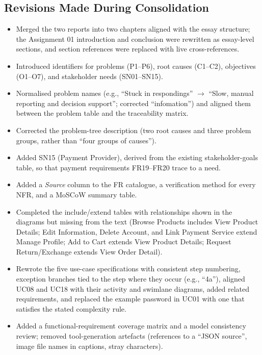 \documentclass[11pt,a4paper,oneside]{extreport}
\begin{document}
\subsection*{Revisions Made During Consolidation}
\begin{itemize}
  \item Merged the two reports into two chapters aligned with the essay structure; the Assignment 01 introduction and conclusion were rewritten as essay-level sections, and section references were replaced with live cross-references.
  \item Introduced identifiers for problems (P1--P6), root causes (C1--C2), objectives (O1--O7), and stakeholder needs (SN01--SN15).
  \item Normalised problem names (e.g., ``Stuck in respondings'' $\rightarrow$ ``Slow, manual reporting and decision support''; corrected ``infomation'') and aligned them between the problem table and the traceability matrix.
  \item Corrected the problem-tree description (two root causes and three problem groups, rather than ``four groups of causes'').
  \item Added SN15 (Payment Provider), derived from the existing stakeholder-goals table, so that payment requirements FR19--FR20 trace to a need.
  \item Added a \emph{Source} column to the FR catalogue, a verification method for every NFR, and a MoSCoW summary table.
  \item Completed the include/extend tables with relationships shown in the diagrams but missing from the text (Browse Products includes View Product Details; Edit Information, Delete Account, and Link Payment Service extend Manage Profile; Add to Cart extends View Product Details; Request Return/Exchange extends View Order Detail).
  \item Rewrote the five use-case specifications with consistent step numbering, exception branches tied to the step where they occur (e.g., ``4a''), aligned UC08 and UC18 with their activity and swimlane diagrams, added related requirements, and replaced the example password in UC01 with one that satisfies the stated complexity rule.
  \item Added a functional-requirement coverage matrix and a model consistency review; removed tool-generation artefacts (references to a ``JSON source'', image file names in captions, stray characters).
\end{itemize}
\end{document}
